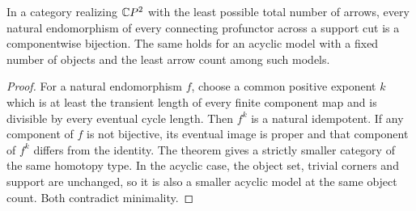 \begin{corollary}
\label{CP2:A-minimal-cut-endomorphisms}
In a category realizing $\mathbb{C}P^2$ with the least possible total
number of arrows, every natural endomorphism of every connecting
profunctor across a support cut is a componentwise bijection.
The same holds for an acyclic model with a fixed number of objects
and the least arrow count among such models.
\end{corollary}
\begin{proof}
For a natural endomorphism $f$, choose a common positive exponent
$k$ which is at least the transient length of every finite component
map and is divisible by every eventual cycle length. Then $f^k$
is a natural idempotent. If any component of $f$ is not bijective,
its eventual image is proper and that component of $f^k$ differs
from the identity. The theorem gives a strictly smaller category
of the same homotopy type. In the acyclic case, the object set,
trivial corners and support are unchanged, so it is also a smaller
acyclic model at the same object count. Both contradict minimality.
\end{proof}
